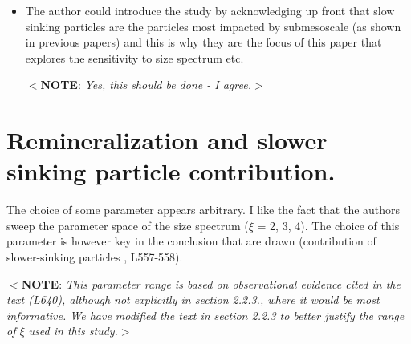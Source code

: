 \documentclass[12pt,letter]{article}
\newcommand{\note}[1]{\color{red}$<$\textbf{NOTE}: \textit{#1}$>$\color{black}}
\begin{document}
\begin{itemize}
	\note{That is also a good point. $w$ are strogner in ML, but we have little particles in the ML, so our fluxes are mostly based on velocities below the ML. Submesoscale-driven subduction have been shown to leak below the ML (cite Sanjiv's paper, and the one from Ruiz and Pascual recently published?). }
	
	\item The author could introduce the study by acknowledging up front that slow sinking particles are the particles most impacted by submesoscale (as shown in previous papers) and this is why they are the focus of this paper that explores the sensitivity to size spectrum etc. 
	
	\note{Yes, this should be done - I agree.}
\end{itemize}

\section*{Remineralization and slower sinking particle contribution.}
The choice of some parameter appears arbitrary. I like the fact that the authors sweep the parameter space of the size spectrum ($\xi$ = 2, 3, 4). The choice of this parameter is however key in the conclusion that are drawn (contribution of slower-sinking particles , L557-558). 

\note{This parameter range is based on observational evidence cited in the text (L640), although not explicitly in section 2.2.3., where it would be most informative. We have modified the text in section 2.2.3 to better justify the range of $\xi$ used in this study.}
\end{document}
